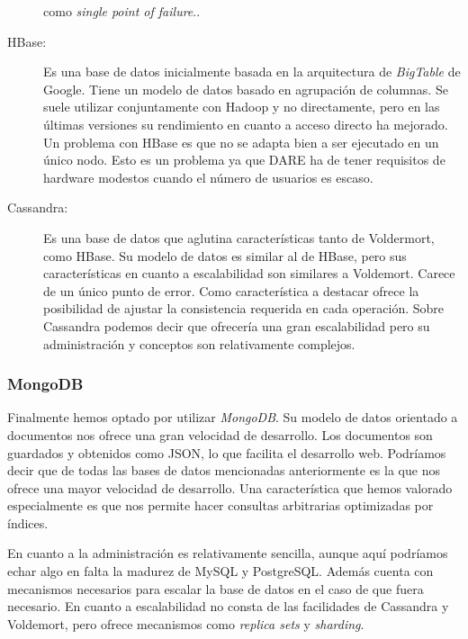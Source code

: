 \begin{description}
{    como \emph{single point of failure}.}.
\item[HBase:] Es una base de datos inicialmente basada en la
  arquitectura de \emph{BigTable} de Google. Tiene un modelo de datos
  basado en agrupación de columnas. Se suele utilizar conjuntamente
  con Hadoop\cite{HADOOP} y no directamente, pero en las últimas
  versiones su rendimiento en cuanto a acceso directo ha mejorado. Un
  problema con HBase es que no se adapta bien a ser ejecutado en un
  único nodo. Esto es un problema ya que DARE ha de tener requisitos
  de hardware modestos cuando el número de usuarios es escaso.
\item[Cassandra:] Es una base de datos que aglutina características
  tanto de Voldermort, como HBase. Su modelo de datos es similar al de
  HBase, pero sus características en cuanto a escalabilidad son
  similares a Voldemort. Carece de un único punto de error. Como
  característica a destacar ofrece la posibilidad de ajustar la
  consistencia requerida en cada operación. Sobre Cassandra podemos
  decir que ofrecería una gran escalabilidad pero su administración y
  conceptos son relativamente complejos.
\end{description}

\subsubsection{MongoDB}
\label{ELECCION-MONGO}

Finalmente hemos optado por utilizar \emph{MongoDB}. Su modelo de
datos orientado a documentos nos ofrece una gran velocidad de
desarrollo. Los documentos son guardados y obtenidos como JSON, lo que
facilita el desarrollo web. Podríamos decir que de todas las bases de
datos mencionadas anteriormente es la que nos ofrece una mayor
velocidad de desarrollo. Una característica que hemos valorado
especialmente es que nos permite hacer consultas arbitrarias
optimizadas por índices.

En cuanto a la administración es relativamente sencilla, aunque aquí
podríamos echar algo en falta la madurez de MySQL y PostgreSQL. Además
cuenta con mecanismos necesarios para escalar la base de datos en el
caso de que fuera necesario. En cuanto a escalabilidad no consta de
las facilidades de Cassandra y Voldemort, pero ofrece mecanismos como
\emph{replica sets} y \emph{sharding}.

